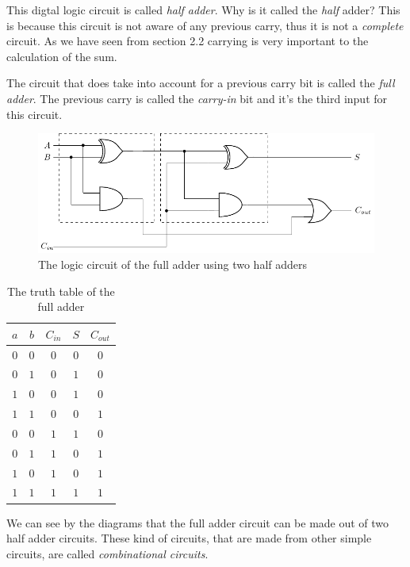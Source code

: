 This digtal logic circuit is called \textit{half adder}.
Why is it called the \textit{half} adder? This is because this circuit is not aware of any previous carry, thus
it is not a \textit{complete} circuit. As we have seen from section 2.2 carrying is very important to the calculation
of the sum.

The circuit that does take into account for a previous carry bit is called the \textit{full adder}.
The previous carry is called the \textit{carry-in} bit and it's the third input for this circuit.

\begin{figure}[ht]
    \centering
    \includegraphics[scale=.7]{images/5_Implementation/classical_fulladder_diagram.pdf}
    \caption{The logic circuit of the full adder using two half adders}
\end{figure}

\begin{table}[!ht]
    \centering
    \begin{tabular}{ccc|cc}
        $a$ & $b$ & $C_{in}$ & $S$ & $C_{out}$ \\
        \hline
        $0$ & $0$ & $0$ & $0$ & $0$ \\
        $0$ & $1$ & $0$ & $1$ & $0$ \\
        $1$ & $0$ & $0$ & $1$ & $0$ \\
        $1$ & $1$ & $0$ & $0$ & $1$ \\
        $0$ & $0$ & $1$ & $1$ & $0$ \\
        $0$ & $1$ & $1$ & $0$ & $1$ \\
        $1$ & $0$ & $1$ & $0$ & $1$ \\
        $1$ & $1$ & $1$ & $1$ & $1$ \\
    \end{tabular}
    \caption{The truth table of the full adder}
\end{table}

\newpage

We can see by the diagrams that the full adder circuit can be made out of
two half adder circuits. These kind of circuits, that are made from other
simple circuits, are called \textit{combinational circuits}.

